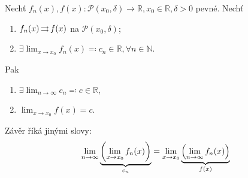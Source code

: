 \begin{veta}\label{16mooreosgood}
    Nechť $f_n(x), f(x)\colon \mathscr P(x_0, \delta)\to \mathbb R, x_0 \in \mathbb R, \delta>0$ pevné. Nechť
    \begin{enumerate}[1.]
        \item $f_n(x)\operatorname{\rightrightarrows} f(x)$ na $\mathscr P(x_0, \delta)$;
        \item $\exists \lim_{x \to x_0} f_n(x)\eqcolon c_n\in \mathbb R, \forall n \in \mathbb N$.
    \end{enumerate}
    Pak
    \begin{enumerate}[1.]
        \item $\exists \lim_{n\to\infty}c_n\eqcolon c \in \mathbb R$,
        \item $\lim_{x\to x_0}f(x)=c$.
    \end{enumerate}
\end{veta}

\begin{poznamka}
    Závěr říká jinými slovy:
    $$\lim_{n\to\infty}\underbrace{\left(\lim_{x\to x_0}f_n(x)\right)}_{\mathclap{c_n}}=\lim_{x\to x_0}\underbrace{\left(\lim_{n\to\infty}f_n(x)\right)}_{\mathclap{f(x)}}$$
\end{poznamka}

